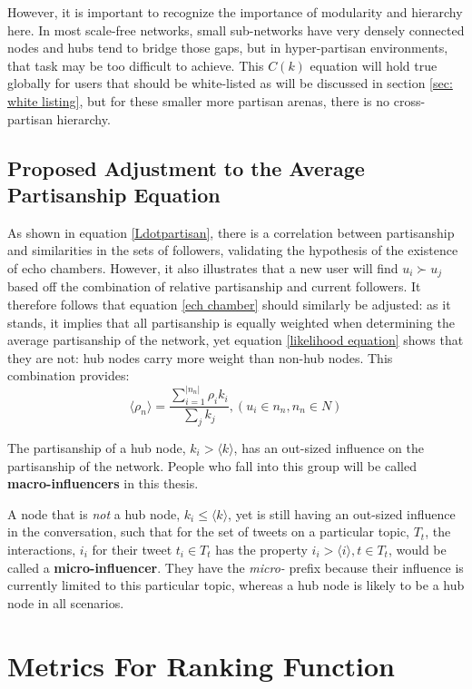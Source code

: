 \documentclass[preprint,review,12pt]{elsarticle}
\begin{document}
However, it is important to recognize the importance of modularity and hierarchy here. In most scale-free networks, small sub-networks have very densely connected nodes and hubs tend to bridge those gaps, but in hyper-partisan environments, that task may be too difficult to achieve. This $C(k)$ equation will hold true globally for users that should be white-listed as will be discussed in section \ref{sec: white listing}, but for these smaller more partisan arenas, there is no cross-partisan hierarchy. 

\subsection{Proposed Adjustment to the Average Partisanship Equation}
As shown in equation \ref{Ldotpartisan}, there is a correlation between partisanship and similarities in the sets of followers, validating the hypothesis of the existence of echo chambers. However, it also illustrates that a new user will find $u_i \succ u_j$ based off the combination of relative partisanship and current followers. It therefore follows that equation \ref{ech chamber} should similarly be adjusted: as it stands, it implies that all partisanship is equally weighted when determining the average partisanship of the network, yet equation \ref{likelihood equation} shows that they are not: hub nodes carry more weight than non-hub nodes. This combination provides:
\begin{equation}
    \label{echo chamber by followers}
        \langle \rho_n \rangle = \frac{\sum_{i=1}^{|n_n|}\rho_ik_i}{\sum_{j}k_j}, (u_i \in n_n, n_n \in N)
 \end{equation}
 
 The partisanship of a hub node, $k_i > \langle k \rangle$, has an out-sized influence on the partisanship of the network. People who fall into this group will be called \textbf{macro-influencers} in this thesis.
 
 A node that is \textit{not} a hub node, $k_i \leq \langle k \rangle$, yet is still having an out-sized influence in the conversation, such that for the set of tweets on a particular topic, $T_t$, the interactions, $i_i$ for their tweet $t_i \in T_t$ has the property $i_i > \langle i \rangle, t \in T_t$, would be called a \textbf{micro-influencer}. They have the \textit{micro-} prefix because their influence is currently limited to this particular topic, whereas a hub node is likely to be a hub node in all scenarios.

\section{Metrics For Ranking Function}
\end{document}
